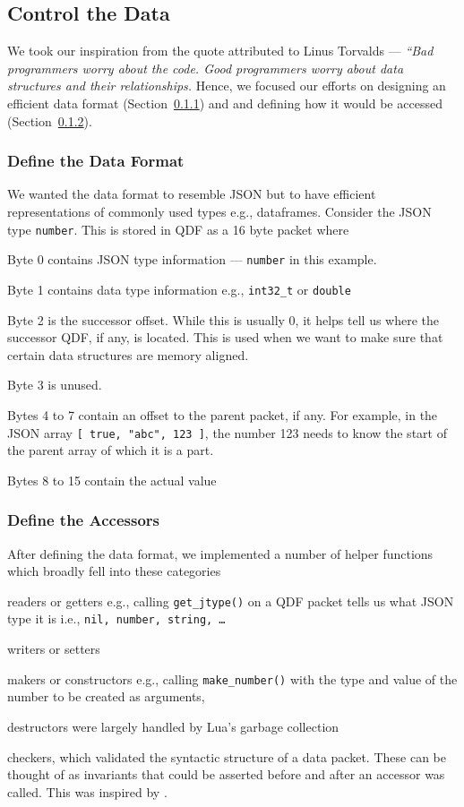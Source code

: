 \documentclass[letterpaper,12pt]{article}
\begin{document}
{\subsection{Control the Data}
We took our inspiration from the quote attributed to Linus Torvalds --- 
{\em ``Bad programmers worry
about the code. Good programmers worry about data structures and their
relationships.} Hence, we focused our efforts on designing an efficient data
format  (Section~\ref{data_format_defn}) and 
and defining how it would be accessed (Section~\ref{accessor_defn}).

\subsubsection{Define the Data Format}
\label{data_format_defn}

We wanted the data format to resemble JSON but to have efficient 
representations of commonly used types e.g., dataframes. Consider the JSON type
{\tt number}. This is stored in QDF as a 16 byte packet where
\be
\item Byte 0 contains JSON type information --- {\tt number} in this example.
\item Byte 1 contains data type information e.g., {\tt int32\_t} or {\tt double}
\item Byte 2 is the successor offset. While this is usually 0, it helps tell us
  where the successor QDF, if any, is located. This is used when we want to
  make sure that certain data structures are memory aligned. 
\item Byte 3 is unused.
\item Bytes 4 to 7 contain an offset to the parent packet, if any. 
  For example,
  in the JSON array \verb+[ true, "abc", 123 ]+, the number 123 needs to 
  know the start of the parent array of which it is a part.
\item Bytes 8 to 15 contain the actual value
  \ee
\subsubsection{Define the Accessors}
\label{accessor_defn}

After defining the data format, we implemented a number of helper 
functions which broadly fell into these categories
\be
\item readers or getters e.g., calling {\tt get\_jtype()} on a QDF packet tells
  us what JSON type it is i.e., {\tt nil, number, string, \ldots}
\item writers or setters
\item makers or constructors e.g., calling {\tt make\_number()} with the 
  type and value of the number to be created as arguments, 
\item destructors were largely handled by Lua's garbage collection
\item checkers, which validated the syntactic structure of a data packet.
  These can be thought of as invariants that could be asserted before and after
  an accessor was called. This was inspired by \cite{hoare1969axiomatic}.

}
\end{document}
